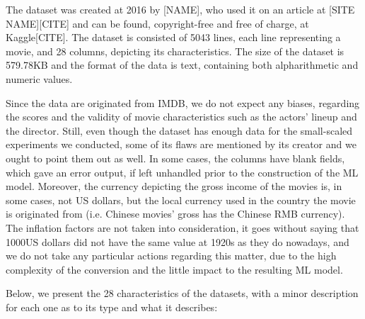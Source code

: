 \documentclass[letterpaper,twocolumn,10pt]{article}
\begin{document}
\par The dataset was created at 2016 by [NAME], who used it on an article at [SITE NAME][CITE] and can be found, copyright-free and free of charge, at Kaggle[CITE]. The dataset is consisted of 5043 lines, each line representing a movie, and 28 columns, depicting its characteristics. The size of the dataset is 579.78KB and the format of the data is text, containing both alpharithmetic and numeric values.\par Since the data are originated from IMDB, we do not expect any biases, regarding the scores and the validity of movie characteristics such as the actors' lineup and the director. Still, even though the dataset has enough data for the small-scaled experiments we conducted, some of its flaws are mentioned by its creator and we ought to point them out as well. In some cases, the columns have blank fields, which gave an error output, if left unhandled prior to the construction of the ML model. Moreover, the currency depicting the gross income of the movies is, in some cases, not US dollars, but the local currency used in the country the movie is originated from (i.e. Chinese movies' gross has the Chinese RMB currency). The inflation factors are not taken into consideration, it goes without saying that 1000US dollars did not have the same value at 1920s as they do nowadays, and we do not take any particular actions regarding this matter, due to the high complexity of the conversion and the little impact to the resulting ML model. \par Below, we present the 28 characteristics of the datasets, with a minor description for each one as to its type and what it describes:
\end{document}
